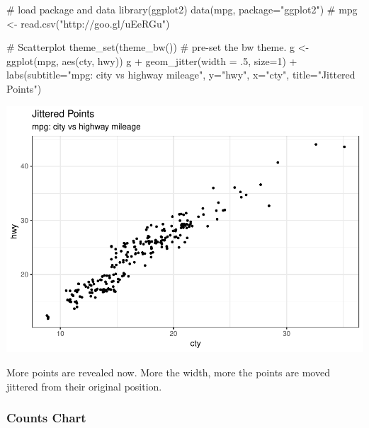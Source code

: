 \documentclass[a4paper]{article}
\newenvironment{Shaded}{}{}
\newcommand{\KeywordTok}[1]{\textcolor[rgb]{0.00,0.00,1.00}{#1}}
\newcommand{\DataTypeTok}[1]{#1}
\newcommand{\DecValTok}[1]{#1}
\newcommand{\StringTok}[1]{\textcolor[rgb]{0.00,0.50,0.50}{#1}}
\newcommand{\CommentTok}[1]{\textcolor[rgb]{0.00,0.50,0.00}{#1}}
\newcommand{\OperatorTok}[1]{#1}
\newcommand{\NormalTok}[1]{#1}
\begin{document}
\begin{Shaded}
\begin{Highlighting}[]
\CommentTok{# load package and data}
\KeywordTok{library}\NormalTok{(ggplot2)}
\KeywordTok{data}\NormalTok{(mpg, }\DataTypeTok{package=}\StringTok{"ggplot2"}\NormalTok{)}
\CommentTok{# mpg <- read.csv("http://goo.gl/uEeRGu")}

\CommentTok{# Scatterplot}
\KeywordTok{theme_set}\NormalTok{(}\KeywordTok{theme_bw}\NormalTok{())  }\CommentTok{# pre-set the bw theme.}
\NormalTok{g <-}\StringTok{ }\KeywordTok{ggplot}\NormalTok{(mpg, }\KeywordTok{aes}\NormalTok{(cty, hwy))}
\NormalTok{g }\OperatorTok{+}\StringTok{ }\KeywordTok{geom_jitter}\NormalTok{(}\DataTypeTok{width =}\NormalTok{ .}\DecValTok{5}\NormalTok{, }\DataTypeTok{size=}\DecValTok{1}\NormalTok{) }\OperatorTok{+}
\StringTok{  }\KeywordTok{labs}\NormalTok{(}\DataTypeTok{subtitle=}\StringTok{"mpg: city vs highway mileage"}\NormalTok{, }
       \DataTypeTok{y=}\StringTok{"hwy"}\NormalTok{, }
       \DataTypeTok{x=}\StringTok{"cty"}\NormalTok{, }
       \DataTypeTok{title=}\StringTok{"Jittered Points"}\NormalTok{)}
\end{Highlighting}
\end{Shaded}

\includegraphics{M24-ggplot2_Gallery_files/figure-latex/unnamed-chunk-5-1.pdf}

More points are revealed now. More the width, more the points are moved
jittered from their original position.

\newpage

\subsubsection{Counts Chart}\label{counts-chart}
\end{document}

